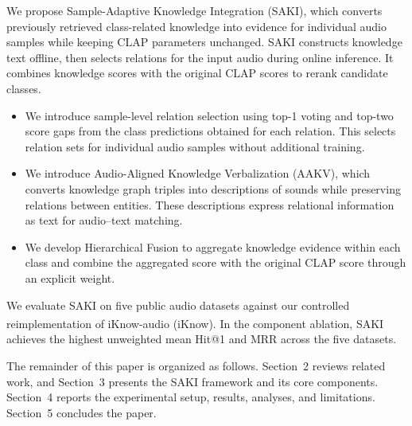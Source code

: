 We propose Sample-Adaptive Knowledge Integration (SAKI), which converts previously retrieved class-related knowledge into evidence for individual audio samples while keeping CLAP parameters unchanged. SAKI constructs knowledge text offline, then selects relations for the input audio during online inference. It combines knowledge scores with the original CLAP scores to rerank candidate classes.

\begin{itemize}
  \item We introduce sample-level relation selection using top-1 voting and top-two score gaps from the class predictions obtained for each relation. This selects relation sets for individual audio samples without additional training.
  \item We introduce Audio-Aligned Knowledge Verbalization (AAKV), which converts knowledge graph triples into descriptions of sounds while preserving relations between entities. These descriptions express relational information as text for audio--text matching.
  \item We develop Hierarchical Fusion to aggregate knowledge evidence within each class and combine the aggregated score with the original CLAP score through an explicit weight. 
\end{itemize}

We evaluate SAKI on five public audio datasets against our controlled reimplementation of iKnow-audio (iKnow\textsuperscript{\dag}).  In the component ablation, SAKI achieves the highest unweighted mean Hit@1 and MRR across the five datasets. 

The remainder of this paper is organized as follows. Section~2 reviews related work, and Section~3 presents the SAKI framework and its core components. Section~4 reports the experimental setup, results, analyses, and limitations. Section~5 concludes the paper.
